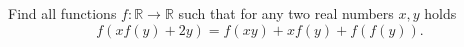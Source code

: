 Find all functions $f:\mathbb{R} \to \mathbb{R}$ such that for any two real numbers $x,y$ holds$$f(xf(y)+2y)=f(xy)+xf(y)+f(f(y)).$$